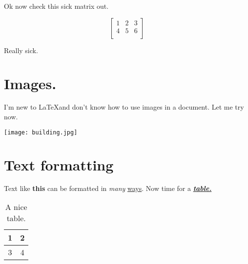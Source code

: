 \documentclass{article}
\begin{document}
Ok now check this sick matrix out.

$$\begin{bmatrix}
1 & 2 & 3\\
4 & 5 & 6\\
\end{bmatrix}
$$

Really sick.

\section{Images.}

I'm new to \LaTeX and don't know how to use images in a document. Let me try now.

\smallskip
\begin{center}
\texttt{[image: building.jpg]}
\end{center}

\section{Text formatting}

Text like \textbf{this} can be formatted in \textit{many} \underline{ways}. Now time for a \textbf{\textit{\underline{table.}}}

\newpage

\begin{table}[]
\caption{A nice table.}
\begin{center}
    \begin{tabular}{|c|c|}
    \hline1 & 2 \\
    \hline3 & 4 \\
    \hline
    \end{tabular}
\end{center}
\end{table}
\end{document}
